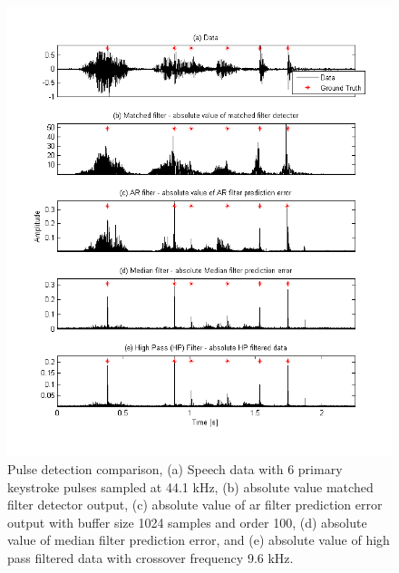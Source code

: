 \begin{figure}[!] %
\centering
\includegraphics[width=130mm]{LitRev_DetectCompareNew.png}
\caption{Pulse detection comparison, (a) Speech data with 6 primary keystroke pulses sampled at 44.1 kHz, (b) absolute value matched filter detector output, (c) absolute value of \gls{ar} filter prediction error output with buffer size 1024 samples and order 100, (d) absolute value of median filter prediction error, and (e) absolute value of high pass filtered data with crossover frequency 9.6 kHz.}
\label{fig:LitRev_DetectCompare}
\end{figure}

